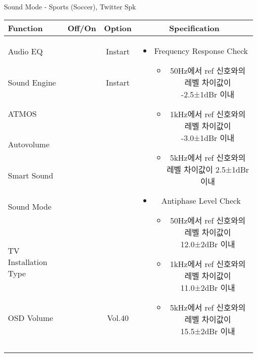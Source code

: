 \begin{frame}[t]{Sound Mode - Sports (Soccer), Twitter Spk}
\begin{tiny}
\begin{tabular}{@{}lccc@{}}
\toprule
Function & Off/On & Option & Specification \\
\midrule
Audio EQ & \color{black}{Off} & Instart &
\multirow{10}{60mm}{
\begin{itemize}
	\item Frequency Response Check
	\begin{itemize}
		\item 50Hz에서 ref 신호와의 레벨 차이값이 -2.5±1dBr 이내
		\item 1kHz에서 ref 신호와의 레벨 차이값이 -3.0±1dBr 이내
		\item 5kHz에서 ref 신호와의 레벨 차이값이 2.5±1dBr 이내	
	\end{itemize}
	\item Antiphase Level Check
	\begin{itemize}
		\item 50Hz에서 ref 신호와의 레벨 차이값이 12.0±2dBr 이내
		\item 1kHz에서 ref 신호와의 레벨 차이값이 11.0±2dBr 이내
		\item 5kHz에서 ref 신호와의 레벨 차이값이 15.5±2dBr 이내
	\end{itemize}
\end{itemize}
} \\
Sound Engine & \color{blue}{On} & Instart & \\
ATMOS & \color{black}{Off}  & & \\
Autovolume & \color{black}{Off} & & \\
Smart Sound & \color{black}{Off} & & \\
Sound Mode & \color{blue}{On} & \color{blue}{Sports} & \\
TV Installation Type & \color{blue}{On} & \color{black}{Standtype1} & \\
OSD Volume & \color{blue}{On} & Vol.40 & \\
& & & \\
& & & \\
& & & \\
& & & \\
\midrule
\end{tabular}
\end{tiny}


\end{frame}
